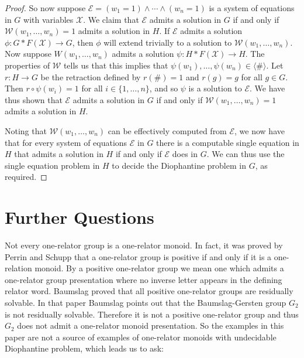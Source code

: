 \documentclass[11pt]{amsart}
\theoremstyle{definition}
\numberwithin{theorem}{section}
\begin{document}
\begin{proof}
	So now suppose \(\mathcal E = (w_1 = 1) \wedge \cdots \wedge (w_n = 1)\) is
	a system of equations in \(G\) with variables \(\mathcal X\). We claim that
	\(\mathcal E\) admits a solution in \(G\) if and only if \(\mathcal W(w_1,
	\ldots, w_n) = 1\) admits a solution in \(H\). If \(\mathcal E\) admits a
	solution \(\phi \colon G \ast F(\mathcal X) \to G\), then \(\phi\) will
	extend trivially to a solution to \(\mathcal W(w_1, \ldots, w_n)\). Now
	suppose \(W(w_1, \ldots, w_n)\) admits a solution \(\psi \colon H \ast
	F(\mathcal X) \to H\). The properties of \(\mathcal W\) tells us that this
	implies that \(\psi(w_1), \ldots, \psi(w_n) \in \langle \# \rangle\). Let
	\(r \colon H \to G\) be the retraction defined by \(r(\#) = 1\) and
	\(r(g) = g\) for all \(g \in G\). Then \(r \circ \psi(w_i) = 1\) for
	all \(i \in \{1, \ldots, n\}\), and so \(\psi\) is a solution to
	\(\mathcal E\). We have thus shown that \(\mathcal E\) admits a solution
	in \(G\) if and only if \(\mathcal W(w_1, \ldots, w_n) = 1\) admits a solution
	in \(H\).

	Noting that \(\mathcal W(w_1, \ldots, w_n)\) can be effectively computed
	from \(\mathcal E\), we now have that for every system of equations
	\(\mathcal E\) in \(G\) there is a computable single equation in \(H\) that
	admits a solution in \(H\) if and only if \(\mathcal E\) does in \(G\). We
	can thus use the single equation problem in \(H\) to decide the Diophantine
	problem in \(G\), as required.
\end{proof}

\section{Further Questions}
Not every one-relator group is a one-relator monoid. In fact, it was proved by 
Perrin and Schupp \cite{Perrin1984} that a one-relator group is positive if and only if it is a one-relation monoid. By a positive one-relator group we mean one which admits a one-relator group presentation where no inverse letter appears in the defining relator word.   
Baumslag \cite{baumslag1971positive}
proved that all positive one-relator groups are residually solvable. 
In that paper Baumslag points out that the Baumslag-Gersten group $G_2$ is not residually solvable. Therefore it is not a  
positive one-relator group and thus $G_2$ does not admit a one-relator monoid presentation.  
So the examples in this paper are not a source of examples of one-relator monoids with undecidable Diophantine problem, which leads us to ask: 
\end{document}
